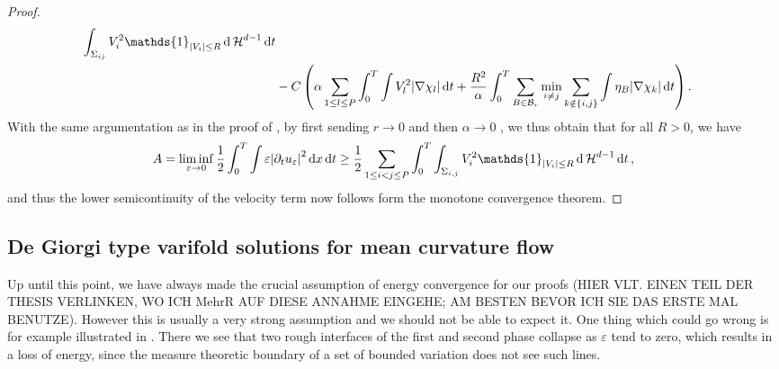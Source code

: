 \begin{proof}
\begin{align*}
				\int_{ \Sigma_{ i j } }
					V_{ i }^{ 2 } \mathds{ 1 }_{ \abs{ V_{ i } } \leq R }
				\dd{ \hm^{ d - 1 } }
			\dd{ t }
		\\
		& -
		C \left(
			\alpha \sum_{ 1 \leq l \leq P }
				\int_{ 0 }^{ T }
					\int
						V_{ l }^{ 2 }
					\abs{ \nabla \chi_{ l } }
				\dd{ t }
			+
			\frac{ R^{ 2 } }{ \alpha }
			\int_{ 0 }^{ T }
				\sum_{ B \in \mathcal{ B }_{ r } }
					\min_{ i \neq j }
						\sum_{ k \notin \{ i , j \} }
							\int
								\eta_{ B }
							\abs{ \nabla \chi_{ k } }
			\dd{ t }
		\right).
	\end{align*}
	With the same argumentation as in the proof of 
	, by first sending $ r \to 0 $ and then 
	$ \alpha \to 0$ , we thus obtain that for all $R > 0 $, we have
	\begin{equation*}
		A = \liminf_{ \varepsilon \to 0 } \frac{ 1 }{ 2 }
		\int_{ 0 }^{ T }
			\int
				\varepsilon \abs{ \partial_{ t } u_{ \varepsilon } }^{ 2 }
			\dd{ x }
		\dd{ t }
		\geq
		\frac{ 1 }{ 2 }
		\sum_{ 1 \leq i < j \leq P }
			\int_{ 0 }^{ T }
				\int_{ \Sigma_{ i , j } }
					V_{ i }^{ 2 }
					\mathds{ 1 }_{ \abs{ V_{ i } } \leq R }
				\dd{ \hm^{ d - 1 } }
			\dd{ t },
	\end{equation*}
	and thus the lower semicontinuity of the velocity term now follows form the 
	monotone convergence theorem.
\end{proof}

\subsection{De Giorgi type varifold solutions for mean curvature flow}
\label{subsection_de_giorgi_type_varifold_solutions_for_mcf}

Up until this point, we have always made the crucial assumption of energy 
convergence for our proofs (HIER VLT. EINEN TEIL DER THESIS VERLINKEN, WO ICH 
MehrR AUF DIESE ANNAHME EINGEHE; AM BESTEN BEVOR ICH SIE DAS ERSTE MAL BENUTZE).
However this is usually a very strong assumption and we should not be able to 
expect it. One thing which could go wrong is for example illustrated in 
. There we see that two rough interfaces of 
the first and second phase collapse as $ \varepsilon $ tend to zero, which 
results in a loss of energy, since the measure theoretic boundary of a set of 
bounded variation does not see such lines.

